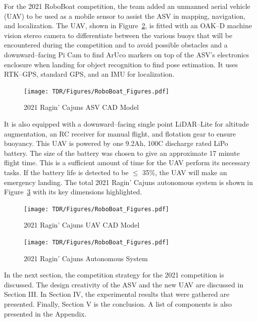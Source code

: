 \documentclass[letterpaper, 12 pt, conference]{ieeeconf}
\begin{document}
For the 2021 RoboBoat competition, the team added an unmanned aerial vehicle (UAV) to be used as a mobile sensor to assist the ASV in mapping, navigation, and localization. The UAV, shown in Figure~\ref{fig:UAV}, is fitted with an OAK--D machine vision stereo camera to differentiate between the various buoys that will be encountered during the competition and to avoid possible obstacles and a downward--facing Pi Cam to find ArUco markers on top of the ASV's electronics enclosure when landing for object recognition to find pose estimation. It uses RTK--GPS, standard GPS, and an IMU for localization.
% 
\begin{figure}[tb]
\vspace{0.05in}
\centering
\texttt{[image: TDR/Figures/RoboBoat\_Figures.pdf]}
\caption{2021 Ragin' Cajuns ASV CAD Model}
\label{fig:RoboBoat}
\end{figure}
% 
It is also equipped with a downward--facing single point LiDAR--Lite for altitude augmentation, an RC receiver for manual flight, and flotation gear to ensure buoyancy. This UAV is powered by one 9.2Ah, 100C discharge rated LiPo battery. The size of the battery was chosen to give an approximate 17 minute flight time. This is a sufficient amount of time for the UAV perform its necessary tasks. If the battery life is detected to be $\le$ 35\%, the UAV will make an emergency landing. The total 2021 Ragin' Cajuns autonomous system is shown in Figure~\ref{fig:complete_system} with its key dimensions highlighted.
\begin{figure}[tb]
\vspace{0.09in}
\centering
\texttt{[image: TDR/Figures/RoboBoat\_Figures.pdf]}
\caption{2021 Ragin' Cajuns UAV CAD Model}
\label{fig:UAV}
\end{figure}
% 
\begin{figure}[tb]
\vspace{0.13in}
\centering
\texttt{[image: TDR/Figures/RoboBoat\_Figures.pdf]}
\caption{2021 Ragin' Cajuns Autonomous System}
\label{fig:complete_system}
\end{figure}
% 

In the next section, the competition strategy for the 2021 competition is discussed. The design creativity of the ASV and the new UAV are discussed in Section III. In Section IV, the experimental results that were gathered are presented. Finally, Section V is the conclusion. A list of components is also presented in the Appendix.
% 
\end{document}
